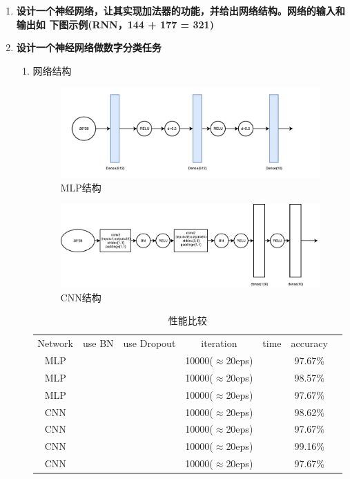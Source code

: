 \documentclass{article}
\begin{document}
 
\begin{CJK*}{UTF8}{gbsn}
 

 \begin{enumerate}[label=(\roman*)]
\item \textbf{设计一个神经网络，让其实现加法器的功能，并给出网络结构。网络的输入和输出如
下图示例(RNN，144 + 177 = 321)}
\item \textbf{设计一个神经网络做数字分类任务}

\begin{enumerate}
	\item 网络结构
	\begin{figure}[h]
	  \centering
	      \includegraphics[width=\textwidth]{MNIST.pdf}
	  \caption{MLP结构}
	\end{figure}

	\begin{figure}[h]
	  \centering
	      \includegraphics[width=\textwidth]{MNIST2.pdf}
	  \caption{CNN结构}
	\end{figure}

	\begin{table}[h]
	\centering
	\caption{性能比较}
	\label{my-label}
	\begin{tabular}{ccccccc}
	\hline
	 Network & use BN & use Dropout & iteration & time & accuracy &  \\
	 MLP &            &             & 10000($\approx$20eps) &      & 97.67\%  & \\
	 MLP & \checkmark &             & 10000($\approx$20eps)&      & 98.57\%  & \\
	 MLP & \checkmark & \checkmark  & 10000($\approx$20eps)&      & 97.67\%  & \\
	 CNN &          &             & 10000($\approx$20eps)&      & 98.62\%  & \\
	 CNN & \checkmark &             & 10000($\approx$20eps)&      & 97.67\%  & \\
	 CNN &            & \checkmark  & 10000($\approx$20eps)&      & 99.16\%  & \\
	 CNN & \checkmark & \checkmark  & 10000($\approx$20eps)&      & 97.67\%  & \\


\end{tabular}
\end{table}
\end{enumerate}
\end{enumerate}
\end{CJK*}
\end{document}
